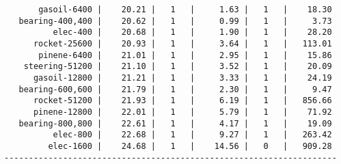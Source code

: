 \begin{lstlisting}
       gasoil-6400 |    20.21 |   1   |     1.63 |   1   |    18.30
   bearing-400,400 |    20.62 |   1   |     0.99 |   1   |     3.73
          elec-400 |    20.68 |   1   |     1.90 |   1   |    28.20
      rocket-25600 |    20.93 |   1   |     3.64 |   1   |   113.01
       pinene-6400 |    21.01 |   1   |     2.95 |   1   |    15.86
    steering-51200 |    21.10 |   1   |     3.52 |   1   |    20.09
      gasoil-12800 |    21.21 |   1   |     3.33 |   1   |    24.19
   bearing-600,600 |    21.79 |   1   |     2.30 |   1   |     9.47
      rocket-51200 |    21.93 |   1   |     6.19 |   1   |   856.66
      pinene-12800 |    22.01 |   1   |     5.79 |   1   |    71.92
   bearing-800,800 |    22.61 |   1   |     4.17 |   1   |    19.09
          elec-800 |    22.68 |   1   |     9.27 |   1   |   263.42
         elec-1600 |    24.68 |   1   |    14.56 |   0   |   909.28
--------------------------------------------------------------------
\end{lstlisting}
    